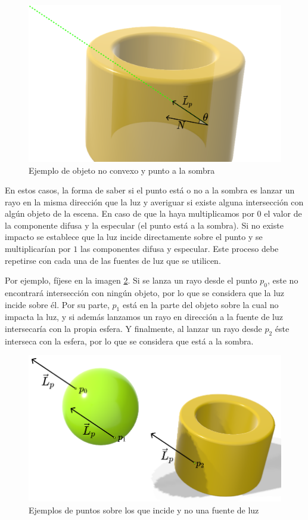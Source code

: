 \begin{figure} [ht]
    \centering
    \includegraphics[scale = 0.25]{img/C7/no-convexo.png}
    \caption{Ejemplo de objeto no convexo y punto a la sombra}
    \label{fig:no-convexo}
\end{figure}

En estos casos, la forma de saber si el punto está o no a la sombra es lanzar un rayo en la misma dirección que la luz y averiguar si existe alguna intersección con algún objeto de la escena. En caso de que la haya multiplicamos por $0$ el valor de la componente difusa y la especular (el punto está a la sombra). Si no existe impacto se establece que la luz incide directamente sobre el punto y se multiplicarían por $1$ las componentes difusa y especular. Este proceso debe repetirse con cada una de las fuentes de luz que se utilicen.

Por ejemplo, fíjese en la imagen \ref{fig:sombras}. Si se lanza un rayo desde el punto $p_0$, este no encontrará intersección con ningún objeto, por lo que se considera que la luz incide sobre él. Por su parte, $p_1$ está en la parte del objeto sobre la cual no impacta la luz, y si además lanzamos un rayo en dirección a la fuente de luz intersecaría con la propia esfera. Y finalmente, al lanzar un rayo desde $p_2$ éste interseca con la esfera, por lo que se considera que está a la sombra.

\begin{figure} [ht]
    \centering
    \includegraphics[scale = 0.3]{img/C7/sombras.png}
    \caption{Ejemplos de puntos sobre los que incide y no una fuente de luz}
    \label{fig:sombras}
\end{figure}

